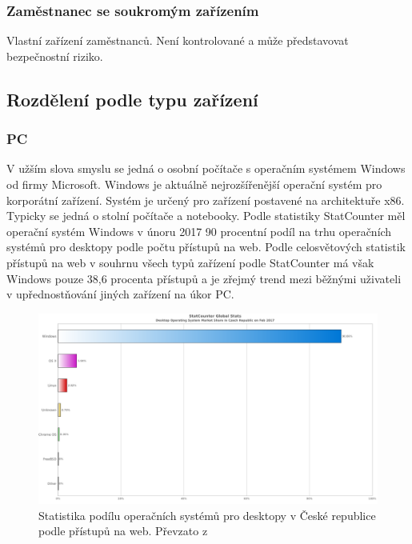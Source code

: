  \subsubsection{Zaměstnanec se soukromým zařízením}
 Vlastní zařízení zaměstnanců. Není kontrolované a může představovat bezpečnostní riziko.
 
 \subsection{Rozdělení podle typu zařízení}
 \subsubsection{PC}
 V užším slova smyslu se jedná o osobní počítače s operačním systémem Windows od firmy Microsoft. Windows je aktuálně nejrozšířenější operační systém pro korporátní zařízení. Systém je určený pro zařízení postavené na architektuře x86. Typicky se jedná o stolní počítače a notebooky. Podle statistiky StatCounter měl operační systém Windows v únoru 2017 90 procentní podíl na trhu operačních systémů pro desktopy podle počtu přístupů na web. Podle celosvětových statistik přístupů na web v souhrnu všech typů zařízení podle StatCounter má však Windows pouze 38,6 procenta přístupů a je zřejmý trend mezi běžnými uživateli v upřednostňování jiných zařízení na úkor PC.  
 
\begin{figure}[h]
\includegraphics[width=13cm]{img/StatCounter_Desktop}
\caption{Statistika podílu operačních systémů pro desktopy v České republice podle přístupů na web. Převzato z \cite{http://gs.statcounter.com/os-market-share/mobile-tablet/czech-republic/}} 
\centering
\end{figure}
 
